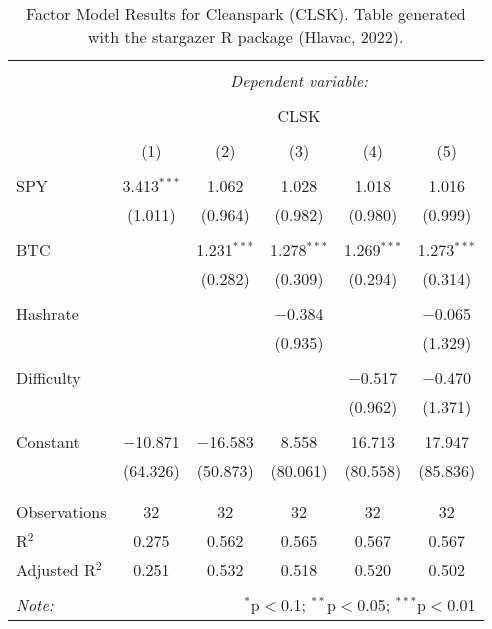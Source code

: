 
\begin{table}[!htbp] \centering 
  \caption{Factor Model Results for Cleanspark (CLSK). Table generated with the stargazer R package (Hlavac, 2022).} 
  \label{ModelResults_CLSK} 
\large 
\begin{tabular}{@{\extracolsep{5pt}}lccccc} 
\\[-1.8ex]\hline 
\hline \\[-1.8ex] 
 & \multicolumn{5}{c}{\textit{Dependent variable:}} \\ 
\cline{2-6} 
\\[-1.8ex] & \multicolumn{5}{c}{CLSK} \\ 
\\[-1.8ex] & (1) & (2) & (3) & (4) & (5)\\ 
\hline \\[-1.8ex] 
 SPY & 3.413$^{***}$ & 1.062 & 1.028 & 1.018 & 1.016 \\ 
  & (1.011) & (0.964) & (0.982) & (0.980) & (0.999) \\ 
  & & & & & \\ 
 BTC &  & 1.231$^{***}$ & 1.278$^{***}$ & 1.269$^{***}$ & 1.273$^{***}$ \\ 
  &  & (0.282) & (0.309) & (0.294) & (0.314) \\ 
  & & & & & \\ 
 Hashrate &  &  & $-$0.384 &  & $-$0.065 \\ 
  &  &  & (0.935) &  & (1.329) \\ 
  & & & & & \\ 
 Difficulty &  &  &  & $-$0.517 & $-$0.470 \\ 
  &  &  &  & (0.962) & (1.371) \\ 
  & & & & & \\ 
 Constant & $-$10.871 & $-$16.583 & 8.558 & 16.713 & 17.947 \\ 
  & (64.326) & (50.873) & (80.061) & (80.558) & (85.836) \\ 
  & & & & & \\ 
\hline \\[-1.8ex] 
Observations & 32 & 32 & 32 & 32 & 32 \\ 
R$^{2}$ & 0.275 & 0.562 & 0.565 & 0.567 & 0.567 \\ 
Adjusted R$^{2}$ & 0.251 & 0.532 & 0.518 & 0.520 & 0.502 \\ 
\hline 
\hline \\[-1.8ex] 
\textit{Note:}  & \multicolumn{5}{r}{$^{*}$p$<$0.1; $^{**}$p$<$0.05; $^{***}$p$<$0.01} \\ 
\end{tabular} 
\end{table} 
